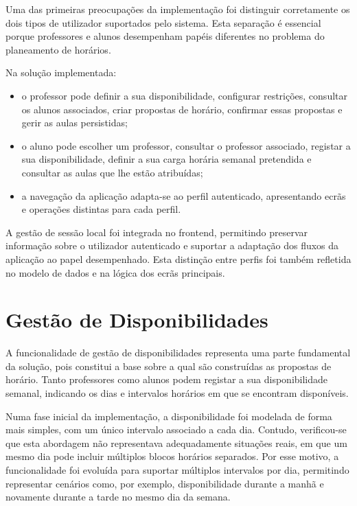 Uma das primeiras preocupações da implementação foi distinguir corretamente os dois tipos de utilizador suportados pelo sistema.
Esta separação é essencial porque professores e alunos desempenham papéis diferentes no problema do planeamento de horários.

Na solução implementada:

\begin{itemize}
    \item o professor pode definir a sua disponibilidade, configurar restrições, consultar os alunos associados, criar propostas de horário, confirmar essas propostas e gerir as aulas persistidas;
    \item o aluno pode escolher um professor, consultar o professor associado, registar a sua disponibilidade, definir a sua carga horária semanal pretendida e consultar as aulas que lhe estão atribuídas;
    \item a navegação da aplicação adapta-se ao perfil autenticado, apresentando ecrãs e operações distintas para cada perfil.
\end{itemize}

A gestão de sessão local foi integrada no frontend, permitindo preservar informação sobre o utilizador autenticado e suportar a adaptação dos fluxos
da aplicação ao papel desempenhado. Esta distinção entre perfis foi também refletida no modelo de dados e na lógica dos ecrãs principais.

\section{Gestão de Disponibilidades}

A funcionalidade de gestão de disponibilidades representa uma parte fundamental da solução, pois constitui a base sobre a qual são construídas as propostas de horário.
Tanto professores como alunos podem registar a sua disponibilidade semanal, indicando os dias e intervalos horários em que se encontram disponíveis.

Numa fase inicial da implementação, a disponibilidade foi modelada de forma mais simples, com um único intervalo associado a cada dia.
Contudo, verificou-se que esta abordagem não representava adequadamente situações reais, em que um mesmo dia pode incluir múltiplos blocos horários separados.
Por esse motivo, a funcionalidade foi evoluída para suportar múltiplos intervalos por dia, permitindo representar cenários como, por exemplo,
disponibilidade durante a manhã e novamente durante a tarde no mesmo dia da semana.


